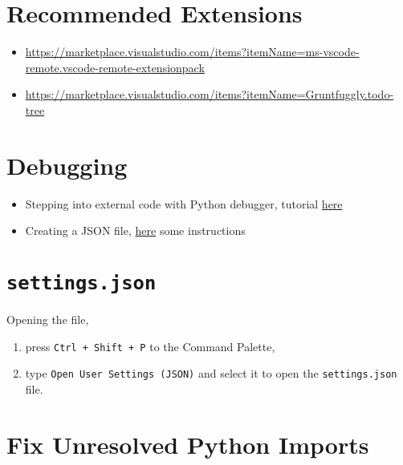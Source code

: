 \documentclass[12pt, a4paper]{scrbook}
\numberwithin{equation}{section}
\theoremstyle{definition}
\theoremstyle{definition}
\begin{document}
	\section{Recommended Extensions}
	
		\begin{itemize}
					
			\item  \url{https://marketplace.visualstudio.com/items?itemName=ms-vscode-remote.vscode-remote-extensionpack}
		
			\item \url{https://marketplace.visualstudio.com/items?itemName=Gruntfuggly.todo-tree}
		
		\end{itemize}	

	\section{Debugging}
	
	\begin{itemize}
		\item Stepping into external code with Python debugger, tutorial \href{https://stackoverflow.com/questions/53594900/visual-studio-code-python-debugging-step-into-the-code-of-external-functions}{here}
		
		\item Creating a JSON file, \href{https://code.visualstudio.com/docs/python/debugging}{here} some instructions
	\end{itemize}

	\section{\texttt{settings.json}}\label{app:open_settings_file_vs}
		Opening the file,
		
		\begin{enumerate}
			\item press \texttt{Ctrl + Shift + P} to the Command Palette, 
			\item type \texttt{Open User Settings (JSON)} and select it to open the \texttt{settings.json} file.
		\end{enumerate}


	\section{Fix Unresolved Python Imports}
	
\end{document}
